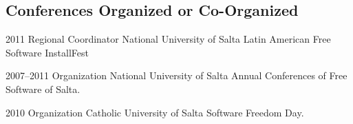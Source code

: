 \documentclass[11pt,a4paper]{moderncv}
\begin{document}
    \subsection{Conferences Organized or Co-Organized}                                                            %

        \cventry                                                                                                  %
            {2011}                                                                                                %
            {Regional Coordinator}                                                                                %
            {National University of Salta}                                                                        %
            {}                                                                                                    %
            {Latin American Free Software InstallFest}                                                            %
            {}                                                                                                    %

        \cventry                                                                                                  %
            {2007--2011}                                                                                          %
            {Organization}                                                                                        %
            {National University of Salta}                                                                        %
            {}                                                                                                    %
            {Annual Conferences of Free Software of Salta.}                                                       %
            {}                                                                                                    %

        \cventry                                                                                                  %
            {2010}                                                                                                %
            {Organization}                                                                                        %
            {Catholic University of Salta}                                                                        %
            {}                                                                                                    %
            {Software Freedom Day.}                                                                               %
            {}                                                                                                    %
\end{document}
